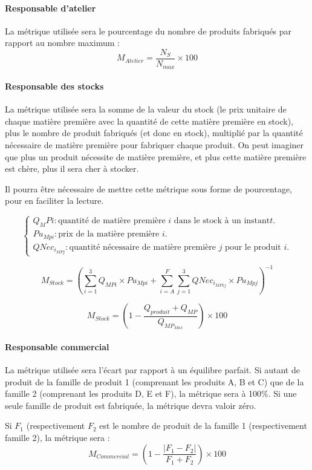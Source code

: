 \paragraph{Responsable d'atelier}
La métrique utilisée sera le pourcentage du nombre de produits fabriqués par
rapport au nombre maximum :
$$
M_{Atelier} = \frac{N_{S}}{N_{max}} \times 100
$$

\paragraph{Responsable des stocks}
La métrique utilisée sera la somme de la valeur du stock (le prix unitaire
de chaque matière première avec la quantité de cette matière
première en stock), plus le nombre de produit fabriqués (et donc en stock),
multiplié par la quantité nécessaire de matière première pour fabriquer chaque
produit. On peut imaginer que plus un produit nécessite de matière première, et
plus cette matière première est chère, plus il sera cher à stocker.

Il pourra être nécessaire de mettre cette métrique sous forme de pourcentage,
pour en faciliter la lecture.

$$
\begin{cases}
Q_MPi : \text{quantité de matière première } i \text{ dans le stock à un instant} t.\\
Pu_{Mpi} : \text{prix de la matière première } i.\\
QNec_{i_{MPj}} : \text{quantité nécessaire de matière première $j$ pour le produit $i$.}
\end{cases}
$$

$$
M_{Stock} =  \left( 
	     \sum_{i=1}^{3} Q_{MPi} \times Pu_{Mpi} + 
	     \sum_{i=A}^{F} \sum_{j=1}^{3} QNec_{i_{MP1j}} \times Pu_{Mpj}
	     \right)^{-1}
$$

$$
M_{Stock} = \left(
	    1 - \frac{Q_{produit} + Q_{MP}}{Q_{MP_{Max}}} 
	    \right) \times 100
$$
\paragraph{Responsable commercial}
La métrique utilisée sera l'écart par rapport à un équilibre parfait.
Si autant de produit de la famille de produit 1 (comprenant les produits A, B
et C) que de la famille 2 (comprenant les produits D, E et F), la métrique sera
à 100\%.
Si une seule famille de produit est fabriquée, la métrique devra valoir zéro.

Si $F_1$ (respectivement $F_2$ est le nombre de produit de la famille 1
(respectivement famille 2), la métrique sera :
$$
M_{Commercial} = \left( 1 - \frac{|F_1 - F_2|}{F_1 + F_2} \right) \times 100
$$

